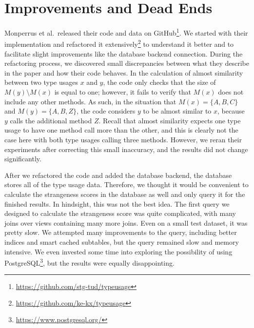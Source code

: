 \section{Improvements and Dead Ends}\label{sec:deadends}


Monperrus et al.\ released their code and data on GitHub\footnote{\url{https://github.com/stg-tud/typeusage}}.
We started with their implementation and refactored it extensively\footnote{\url{https://github.com/ke-kx/typeusage}} to understand it better and to facilitate slight improvements like the database backend connection.
During the refactoring process, we discovered small discrepancies between what they describe in the paper and how their code behaves.
In the calculation of almost similarity between two type usages $x$ and $y$, the code only checks that the size of $M(y) \setminus M(x)$ is equal to one; however, it fails to verify that $M(x)$ does not include any other methods.
As such, in the situation that $M(x) =\{A, B, C\}$ and $M(y) = \{A, B, Z\}$, the code considers $y$ to be almost similar to $x$, because $y$ calls the additional method $Z$.
Recall that almost similarity expects one type usage to have one method call more than the other, and this is clearly not the case here with both type usages calling three methods.
However, we reran their experiments after correcting this small inaccuracy, and the results did not change significantly.

After we refactored the code and added the database backend, the database stores all of the type usage data.
Therefore, we thought it would be convenient to calculate the strangeness scores in the database as well and only query it for the finished results.
In hindsight, this was not the best idea.
The first query we designed to calculate the strangeness score was quite complicated, with many joins over views containing many more joins.
Even on a small test dataset, it was pretty slow.
We attempted many improvements to the query, including better indices and smart cached subtables, but the query remained slow and memory intensive.
We even invested some time into exploring the possibility of using PostgreSQL\footnote{\url{https://www.postgresql.org/}}, but the results were equally disappointing.

